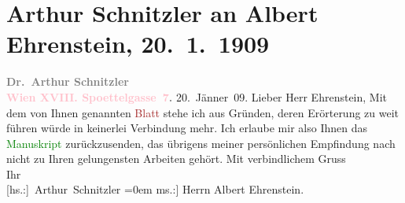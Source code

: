 

               \section[Arthur Schnitzler an Albert Ehrenstein, 20. 1. 1909]{ Arthur Schnitzler an Albert Ehrenstein, 20. 1. 1909}\nopagebreak{}\rehead{ }\normalsize\beginnumbering{} \toendnotes[C]{\smallbreak\pagebreak[2]} 
\toendnotes[C]{\smallbreak}\pstart
           \noindent{}{\pb}\textcolor{gray}{\textbf{Dr. Arthur Schnitzler}}{\\}\textcolor{gray}{\textbf{\textcolor{pink}{Wien XVIII. Spoettelgasse 7}{}\ledrightnote{\textcolor{pink}{Edmund-Weiß-Gasse}}.}}\pend
           \pstart
           \raggedleft{}20. Jänner 09.\pend
           \pstart{}Lieber Herr Ehrenstein,\pend\pstart
           Mit dem von Ihnen genannten \textcolor{brown}{Blatt}{} stehe ich aus Gründen, deren Erörterung zu weit führen würde in
                    keinerlei Verbindung mehr. Ich erlaube mir also Ihnen das \textcolor{green}{Manuskript}{} zurückzusenden, das übrigens
                    meiner persönlichen Empfindung nach nicht zu Ihren gelungensten Arbeiten
                    gehört.\pend
           \pstart
           Mit verbindlichem Gruss{\\[\baselineskip]} Ihr{\\[\baselineskip]}\spacefill\mbox{{[}hs.:{]} Arthur Schnitzler}\pend
           \leftskip=0em{}\pstart
           \noindent{}{[}ms.:{]} Herrn Albert Ehrenstein.\pend
           \endnumbering{}  
      
